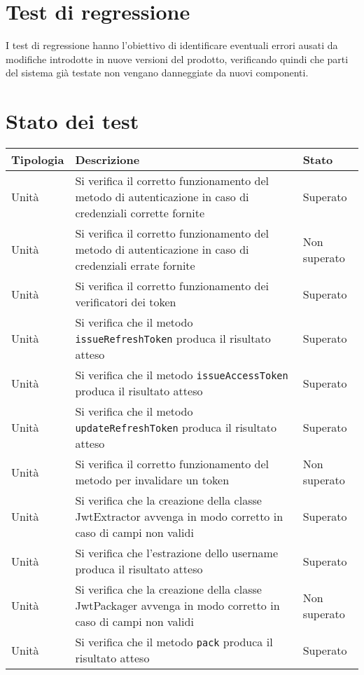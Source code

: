 \section{Test di regressione}
I test di regressione hanno l'obiettivo di identificare eventuali errori ausati da modifiche introdotte in nuove versioni del prodotto, verificando quindi che parti del sistema già testate non vengano danneggiate da nuovi componenti.

\section{Stato dei test}

\begin{center}
    \begin{xltabular}{\linewidth}{|l|X|l|}
        \hline
        \textbf{Tipologia} & \textbf{Descrizione} & \textbf{Stato}\\
        \hline
        Unità & Si verifica il corretto funzionamento del metodo di autenticazione in caso di credenziali corrette fornite & Superato\\
        Unità & Si verifica il corretto funzionamento del metodo di autenticazione in caso di credenziali errate fornite & Non superato\\
        Unità & Si verifica il corretto funzionamento dei verificatori dei token & Superato\\
        Unità & Si verifica che il metodo \texttt{issueRefreshToken} produca il risultato atteso & Superato\\
        Unità & Si verifica che il metodo \texttt{issueAccessToken} produca il risultato atteso & Superato\\
        Unità & Si verifica che il metodo \texttt{updateRefreshToken} produca il risultato atteso & Superato\\
        Unità & Si verifica il corretto funzionamento del metodo per invalidare un token & Non superato\\
        Unità & Si verifica che la creazione della classe JwtExtractor avvenga in modo corretto in caso di campi non validi & Superato\\
        Unità & Si verifica che l'estrazione dello username produca il risultato atteso & Superato\\
        Unità & Si verifica che la creazione della classe JwtPackager avvenga in modo corretto in caso di campi non validi & Non superato\\
        Unità & Si verifica che il metodo \texttt{pack} produca il risultato atteso & Superato\\

\end{xltabular}
\end{center}

